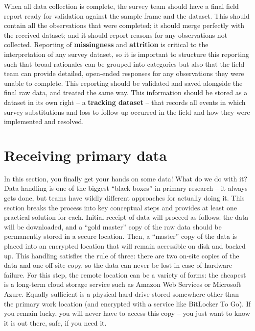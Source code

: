 When all data collection is complete,
the survey team should have a final field report
ready for validation against the sample frame and the dataset.
This should contain all the observations that were completed;
it should merge perfectly with the received dataset;
and it should report reasons for any observations not collected.
Reporting of \textbf{missingness} and \textbf{attrition} is critical
to the interpretation of any survey dataset,
so it is important to structure this reporting
such that broad rationales can be grouped into categories
but also that the field team can provide detailed, open-ended responses
for any observations they were unable to complete.
This reporting should be validated and saved
alongside the final raw data, and treated the same way.
This information should be stored as a dataset in its own right
-- a \textbf{tracking dataset} --
that records all events in which survey substitutions
and loss to follow-up occurred in the field
and how they were implemented and resolved.


\section{Receiving primary data}

In this section, you finally get your hands on some data!
What do we do with it? Data handling is one of the biggest
``black boxes'' in primary research -- it always gets done,
but teams have wildly different approaches for actually doing it.
This section breaks the process into key conceptual steps
and provides at least one practical solution for each.
Initial receipt of data will proceed as follows:
the data will be downloaded, and a ``gold master'' copy
of the raw data should be permanently stored in a secure location.
Then, a ``master'' copy of the data is placed into an encrypted location
that will remain accessible on disk and backed up.
This handling satisfies the rule of three:
there are two on-site copies of the data and one off-site copy,
so the data can never be lost in case of hardware failure.
For this step, the remote location can be a variety of forms:
the cheapest is a long-term cloud storage service
such as Amazon Web Services or Microsoft Azure.
Equally sufficient is a physical hard drive
stored somewhere other than the primary work location
(and encrypted with a service like BitLocker To Go).
If you remain lucky, you will never have to access this copy --
you just want to know it is out there, safe, if you need it.


